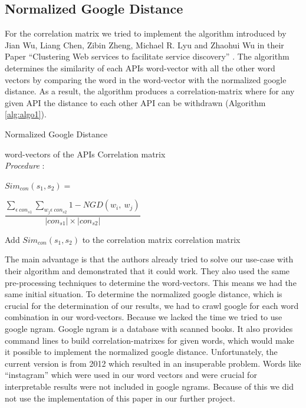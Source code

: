 \documentclass[a4paper]{IEEEtran}
\begin{document}
\subsection{Normalized Google Distance}
For the correlation matrix we tried to implement the algorithm introduced by Jian Wu, Liang Chen, Zibin Zheng, Michael R. Lyu and Zhaohui Wu in their Paper “Clustering Web services to facilitate service discovery” \cite{kanungo2002efficient}. The algorithm determines the similarity of each APIs word-vector with all the other word vectors by comparing the word in the word-vector with the normalized google distance. As a result, the algorithm produces a correlation-matrix where for any given API the distance to each other API can be withdrawn (Algorithm \ref{alg:algo1}).

\begin{algorithm}[H]
 \caption{Normalized Google Distance}
 \label{alg:algo1}
 \begin{algorithmic}[1]
\renewcommand{\algorithmicrequire}{\textbf{Input:}}
 \renewcommand{\algorithmicensure}{\textbf{Output:}}
 \REQUIRE word-vectors of the APIs
 \ENSURE  Correlation matrix
 \\ \textit{Procedure} :
\STATE 
\parbox[c][1cm]{1\linewidth}{
$Sim_{con}(s_1,s_2)=$
}
\parbox[c][1cm]{1\linewidth}{
$\dfrac{\sum_{\epsilon\ {con}_{s1}}\sum_{w_j\epsilon\ {con}_{s2}}{1-NGD(w_i,\ w_j)}}{\left|{con}_{s1}\right|\times\left|{con}_{s2}\right|}$
}


 \STATE Add ${Sim}_{con}\left(s_1,s_2\right)$ to the correlation matrix 
\ENDFOR
\ENDFOR
\RETURN correlation matrix

 \end{algorithmic}
 \end{algorithm}


The main advantage is that the authors already tried to solve our use-case with their algorithm and demonstrated that it could work. They also used the same pre-processing techniques to determine the word-vectors. This means we had the same initial situation.
To determine the normalized google distance, which is crucial for the determination of our results, we had to crawl google for each word combination in our word-vectors. Because we lacked the time we tried to use google ngram. Google ngram is a database with scanned books. It also provides command lines to build correlation-matrixes for given words, which would make it possible to implement the normalized google distance. Unfortunately, the current version is from 2012 which resulted in an insuperable problem. Words like “instagram” which were used in our word vectors and were crucial for interpretable results were not included in google ngrams. Because of this we did not use the implementation of this paper in our further project.
\end{document}
